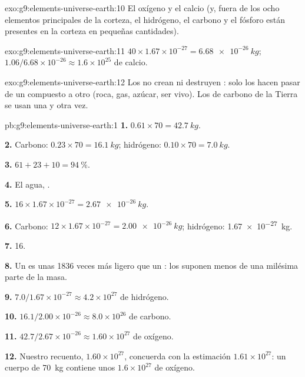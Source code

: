 \begin{solution}{exo:g9:elements-universe-earth:10}
El oxígeno y el calcio (y, fuera de los ocho elementos principales de
la corteza, el hidrógeno, el carbono y el fósforo están presentes en la
corteza en pequeñas cantidades).
\end{solution}

\begin{solution}{exo:g9:elements-universe-earth:11}
$40 \times 1.67 \times 10^{-27} = \qty{6.68e-26}{kg}$;
$1.06 / 6.68 \times 10^{-26} \approx 1.6 \times 10^{25}$  de calcio.
\end{solution}

\begin{solution}{exo:g9:elements-universe-earth:12}
Los  no crean ni destruyen : solo los hacen pasar
de un compuesto a otro (roca, gas, azúcar, ser vivo). Los  de
carbono de la Tierra se usan una y otra vez.
\end{solution}

\begin{solution}{pb:g9:elements-universe-earth:1}
\textbf{1.} $0.61 \times 70 = \qty{42.7}{kg}$.

\textbf{2.} Carbono: $0.23 \times 70 = \qty{16.1}{kg}$; hidrógeno:
$0.10 \times 70 = \qty{7.0}{kg}$.

\textbf{3.} $61 + 23 + 10 = \qty{94}{\percent}$.

\textbf{4.} El agua, .

\textbf{5.} $16 \times 1.67 \times 10^{-27} = \qty{2.67e-26}{kg}$.

\textbf{6.} Carbono: $12 \times 1.67 \times 10^{-27} = \qty{2.00e-26}{kg}$;
hidrógeno: \qty{1.67e-27}{kg}.

\textbf{7.} 16.

\textbf{8.} Un  es unas 1836 veces más ligero que un :
los  suponen menos de una milésima parte de la masa.

\textbf{9.} $7.0 / 1.67 \times 10^{-27} \approx 4.2 \times 10^{27}$
 de hidrógeno.

\textbf{10.} $16.1 / 2.00 \times 10^{-26} \approx 8.0 \times 10^{26}$
 de carbono.

\textbf{11.} $42.7 / 2.67 \times 10^{-26} \approx 1.60 \times 10^{27}$
 de oxígeno.

\textbf{12.} Nuestro recuento, $1.60 \times 10^{27}$, concuerda con la
estimación $1.61 \times 10^{27}$: un cuerpo de \qty{70}{kg} contiene
unos $1.6 \times
10^{27}$  de oxígeno.
\end{solution}
